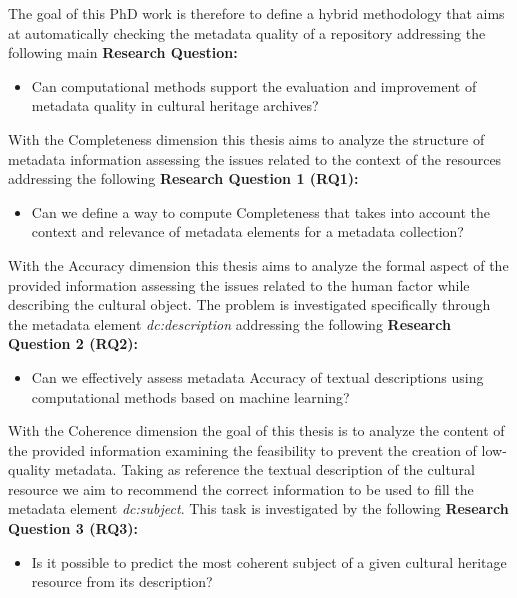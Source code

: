 \documentclass[epsfig,a4paper,12pt,titlepage]{book}
\begin{document}
The goal of this PhD work is therefore to define a hybrid methodology that aims at automatically checking the metadata quality of a repository addressing the following main \textbf{Research Question:} 
\begin{itemize}
    \item Can computational methods support the evaluation and improvement of metadata quality in cultural heritage archives? 
\end{itemize}

With the Completeness dimension this thesis aims to analyze the structure of metadata information assessing the issues related to the context of the resources addressing the following \textbf{Research Question 1 (RQ1):} 
\begin{itemize}
    \item Can we define a way to compute Completeness that takes into account the context and relevance of metadata elements for a metadata collection?
\end{itemize}
With the Accuracy dimension this thesis aims to analyze the formal aspect of the provided information assessing the issues related to the human factor while describing the cultural object. The problem is investigated specifically through the metadata element \textit{dc:description} addressing the following \textbf{Research Question 2 (RQ2):}
\begin{itemize}
    \item Can we effectively assess metadata Accuracy of textual descriptions using computational methods based on machine learning?
\end{itemize}

With the Coherence dimension the goal of this thesis is to analyze the content of the provided information examining the feasibility to prevent the creation of low-quality metadata. Taking as reference the textual description of the cultural resource we aim to recommend the correct information to be used to fill the metadata element \textit{dc:subject}. This task is investigated by the following \textbf{Research Question 3 (RQ3):} 
\begin{itemize}
    \item Is it possible to predict the most coherent subject of a given cultural heritage resource from its description?
\end{itemize}


\end{document}
